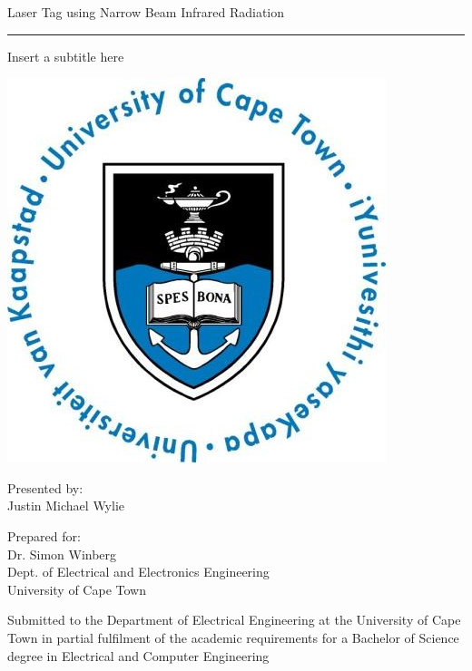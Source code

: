 \documentclass[a4paper,12pt]{report}
\begin{document}
\thispagestyle{empty}
{\Huge \begin{center}
Laser Tag using Narrow Beam Infrared Radiation
\hrule 
{\Large Insert a subtitle here}
\end{center}}

\vskip 5mm
\begin{center}
\- \- \- \- \- \- \- \- \- \-\includegraphics[scale = 0.3]{figures/template/uctLogo.png}
\end{center}

\vskip 5mm
\begin{center}
Presented by:\\
Justin Michael Wylie		%
\end{center}

\vskip 10mm
\begin{center}
Prepared for:\\
Dr. Simon Winberg\\ 		%
Dept. of Electrical and Electronics Engineering\\University of Cape Town
\end{center}


\vskip 10mm
\begin{center}
Submitted to the Department of Electrical Engineering at the University of Cape Town in partial
fulfilment of the academic requirements for a Bachelor of Science degree in Electrical and Computer Engineering

\end{center}
\end{document}

